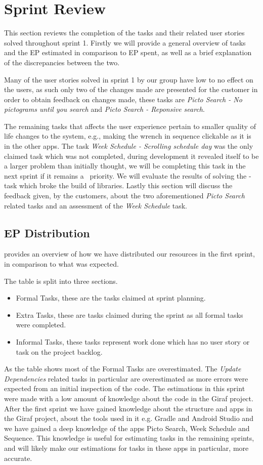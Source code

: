 \section{Sprint Review}\label{s1rev}
This section reviews the completion of the tasks and their related user stories solved throughout sprint 1.
Firstly we will provide a general overview of tasks and the EP estimated in comparison to EP spent, as well as a brief explanation of the discrepancies between the two.

Many of the user stories solved in sprint 1 by our group have low to no effect on the users, as such only two of the changes made are presented for the customer in order to obtain feedback on changes made, these tasks are \textit{Picto Search - No pictograms until you search} and \textit{Picto Search - Reponsive search}.

The remaining tasks that affects the user experience pertain to smaller quality of life changes to the system, e.g., making the wrench in sequence clickable as it is in the other apps. 
The task \textit{Week Schedule - Scrolling schedule day} was the only claimed task which was not completed, during development it revealed itself to be a larger problem than initially thought, we will be completing this task in the next sprint if it remains a \phigh~priority.
We will evaluate the results of solving the \pblocking-task which broke the build of libraries. 
Lastly this section will discuss the feedback given, by the customers, about the two aforementioned \textit{Picto Search} related tasks and an assessment of the \textit{Week Schedule} task.

\subsection{EP Distribution}
 provides an overview of how we have distributed our resources in the first sprint, in comparison to what was expected.

The table is split into three sections.
\begin{itemize}
    \item Formal Tasks, these are the tasks claimed at sprint planning.
    \item Extra Tasks, these are tasks claimed during the sprint as all formal tasks were completed.
    \item Informal Tasks, these tasks represent work done which has no user story or task on the project backlog.
\end{itemize}
As the table shows most of the Formal Tasks are overestimated.
The \textit{Update Dependencies} related tasks in particular are overestimated as more errors were expected from an initial inspection of the code.
The estimations in this sprint were made with a low amount of knowledge about the code in the Giraf project.
After the first sprint we have gained knowledge about the structure and apps in the Giraf project, about the tools used in it e.g. Gradle and Android Studio and we have gained a deep knowledge of the apps Picto Search, Week Schedule and Sequence.
This knowledge is useful for estimating tasks in the remaining sprints, and will likely make our estimations for tasks in these apps in particular, more accurate.

